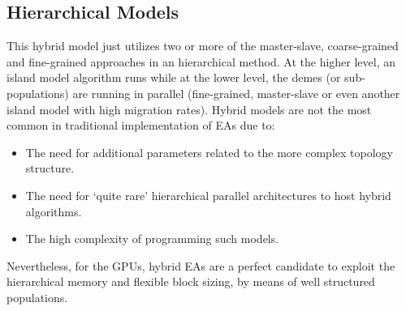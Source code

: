 \documentclass[review]{elsarticle}
\begin{document}
\subsection{Hierarchical Models}

This hybrid model just utilizes two or more of the master-slave, coarse-grained and fine-grained approaches in an hierarchical method. At the higher level, an island model algorithm runs while at the lower level, the demes (or sub-populations) are running in parallel (fine-grained, master-slave or even another island model with high migration rates). Hybrid models are not the most common in traditional implementation of EAs due to:
\begin{itemize}
 \item The need for additional parameters related to the more complex topology structure. 
 \item The need for `quite rare' hierarchical parallel architectures to host hybrid algorithms. 
\item The high complexity of programming such models. 
\end{itemize}

Nevertheless, for the GPUs, hybrid EAs are a perfect candidate to exploit the hierarchical memory and flexible block sizing, by means of well structured populations. 
\end{document}
